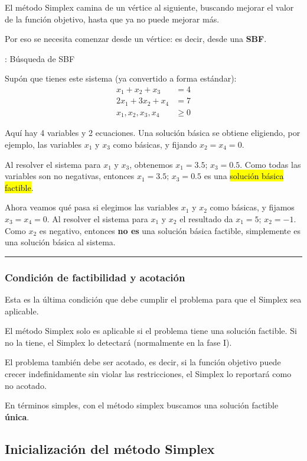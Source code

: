 El método Simplex camina de un vértice al siguiente, buscando mejorar el valor de la función objetivo, hasta que ya no puede mejorar más.

Por eso se necesita comenzar desde un vértice: es decir, desde una \textbf{SBF}.

\ejemplo\label{ej:busqueda_sbf}{: Búsqueda de SBF}

Supón que tienes este sistema (ya convertido a forma estándar):
\begin{align*}
  x_1 + x_2 + x_3 &= 4 \\
  2x_1 + 3x_2 + x_4 &= 7 \\
  x_1, x_2, x_3, x_4 &\geq 0
 \end{align*}

Aquí hay 4 variables y 2 ecuaciones. Una solución básica se obtiene eligiendo, por ejemplo, las variables \(x_1\) y \(x_3\) como básicas, y fijando \(x_2 = x_4 = 0\).

Al resolver el sistema para \(x_1\) y \(x_3\), obtenemos \(x_1 = 3.5;\, x_3 = 0.5\). Como todas las variables son no negativas, entonces \(x_1 = 3.5;\, x_3 = 0.5\) es una \hl{solución básica factible}.

Ahora veamos qué pasa si elegimos las variables \(x_1\) y \(x_2\) como básicas, y fijamos \(x_3 = x_4 = 0\). Al resolver el sistema para \(x_1\) y \(x_2\) el resultado da \(x_1 = 5;\, x_2 = -1\). Como \(x_2\) es negativo, entonces \textbf{no es} una solución básica factible, simplemente es una solución básica al sistema.
\vspace{5mm}
\hrule

\subsubsection{Condición de factibilidad y acotación}

Esta es la última condición que debe cumplir el problema para que el Simplex sea aplicable.

El método Simplex solo es aplicable si el problema tiene una solución factible. Si no la tiene, el Simplex lo detectará (normalmente en la fase I).

El problema también debe ser acotado, es decir, si la función objetivo puede crecer indefinidamente sin violar las restricciones, el Simplex lo reportará como no acotado.

En términos simples, con el método simplex buscamos una solución factible \textbf{única}.

\subsection{Inicialización del método Simplex}

